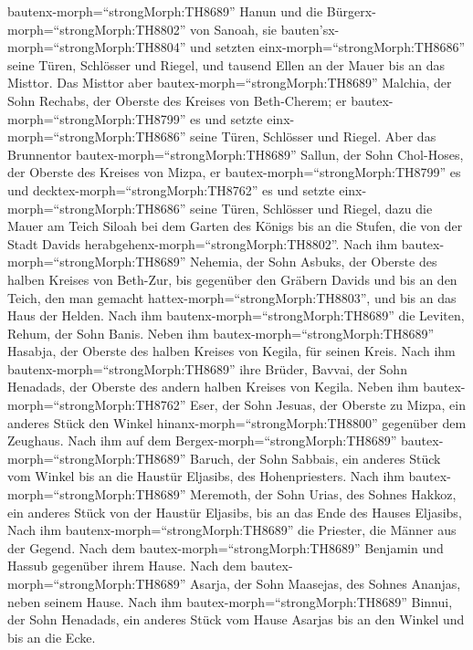 bautenx-morph=``strongMorph:TH8689'' Hanun und die
Bürgerx-morph=``strongMorph:TH8802'' von Sanoah, sie
bauten'sx-morph=``strongMorph:TH8804'' und setzten
einx-morph=``strongMorph:TH8686'' seine Türen, Schlösser und Riegel, und
tausend Ellen an der Mauer bis an das Misttor.  Das Misttor
aber bautex-morph=``strongMorph:TH8689'' Malchia, der Sohn Rechabs, der
Oberste des Kreises von Beth-Cherem; er
bautex-morph=``strongMorph:TH8799'' es und setzte
einx-morph=``strongMorph:TH8686'' seine Türen, Schlösser und Riegel.
 Aber das Brunnentor bautex-morph=``strongMorph:TH8689''
Sallun, der Sohn Chol-Hoses, der Oberste des Kreises von Mizpa, er
bautex-morph=``strongMorph:TH8799'' es und
decktex-morph=``strongMorph:TH8762'' es und setzte
einx-morph=``strongMorph:TH8686'' seine Türen, Schlösser und Riegel,
dazu die Mauer am Teich Siloah bei dem Garten des Königs bis an die
Stufen, die von der Stadt Davids
herabgehenx-morph=``strongMorph:TH8802''.  Nach ihm
bautex-morph=``strongMorph:TH8689'' Nehemia, der Sohn Asbuks, der
Oberste des halben Kreises von Beth-Zur, bis gegenüber den Gräbern
Davids und bis an den Teich, den man gemacht
hattex-morph=``strongMorph:TH8803'', und bis an das Haus der Helden.
 Nach ihm bautenx-morph=``strongMorph:TH8689'' die Leviten,
Rehum, der Sohn Banis. Neben ihm bautex-morph=``strongMorph:TH8689''
Hasabja, der Oberste des halben Kreises von Kegila, für seinen Kreis.
 Nach ihm bautenx-morph=``strongMorph:TH8689'' ihre Brüder,
Bavvai, der Sohn Henadads, der Oberste des andern halben Kreises von
Kegila.  Neben ihm bautex-morph=``strongMorph:TH8762''
Eser, der Sohn Jesuas, der Oberste zu Mizpa, ein anderes Stück den
Winkel hinanx-morph=``strongMorph:TH8800'' gegenüber dem Zeughaus.
 Nach ihm auf dem Bergex-morph=``strongMorph:TH8689''
bautex-morph=``strongMorph:TH8689'' Baruch, der Sohn Sabbais, ein
anderes Stück vom Winkel bis an die Haustür Eljasibs, des
Hohenpriesters.  Nach ihm
bautex-morph=``strongMorph:TH8689'' Meremoth, der Sohn Urias, des Sohnes
Hakkoz, ein anderes Stück von der Haustür Eljasibs, bis an das Ende des
Hauses Eljasibs,  Nach ihm
bautenx-morph=``strongMorph:TH8689'' die Priester, die Männer aus der
Gegend.  Nach dem bautex-morph=``strongMorph:TH8689''
Benjamin und Hassub gegenüber ihrem Hause. Nach dem
bautex-morph=``strongMorph:TH8689'' Asarja, der Sohn Maasejas, des
Sohnes Ananjas, neben seinem Hause.  Nach ihm
bautex-morph=``strongMorph:TH8689'' Binnui, der Sohn Henadads, ein
anderes Stück vom Hause Asarjas bis an den Winkel und bis an die Ecke.
